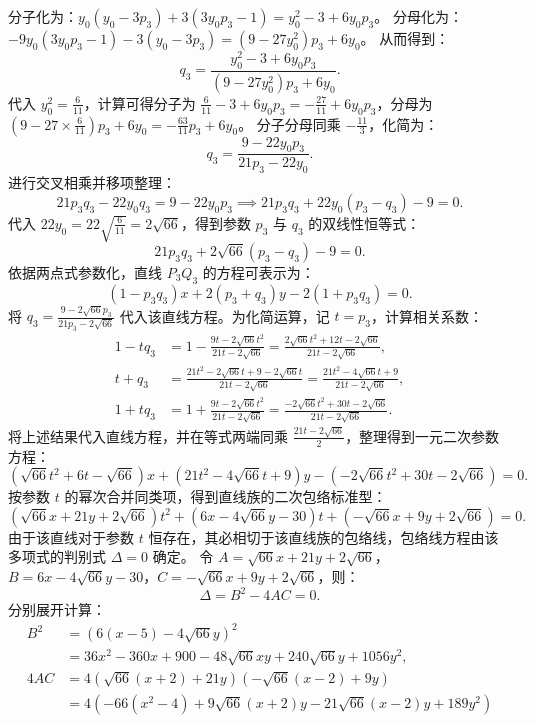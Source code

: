 \begin{solution}
分子化为：$y_0(y_0 - 3p_3) + 3(3y_0 p_3 - 1) = y_0^2 - 3 + 6y_0 p_3$。
分母化为：$-9y_0(3y_0 p_3 - 1) - 3(y_0 - 3p_3) = (9 - 27y_0^2)p_3 + 6y_0$。
从而得到：
\[
q_3 = \frac{y_0^2 - 3 + 6y_0 p_3}{(9 - 27y_0^2)p_3 + 6y_0}.
\]
代入 $y_0^2 = \frac{6}{11}$，计算可得分子为 $\frac{6}{11} - 3 + 6y_0 p_3 = -\frac{27}{11} + 6y_0 p_3$，分母为 $\left(9 - 27 \times \frac{6}{11}\right)p_3 + 6y_0 = -\frac{63}{11} p_3 + 6y_0$。
分子分母同乘 $-\frac{11}{3}$，化简为：
\[
q_3 = \frac{9 - 22y_0 p_3}{21 p_3 - 22y_0}.
\]
进行交叉相乘并移项整理：
\[
21 p_3 q_3 - 22y_0 q_3 = 9 - 22y_0 p_3 \implies 21 p_3 q_3 + 22y_0(p_3 - q_3) - 9 = 0.
\]
代入 $22y_0 = 22\sqrt{\frac{6}{11}} = 2\sqrt{66}$，得到参数 $p_3$ 与 $q_3$ 的双线性恒等式：
\[
21 p_3 q_3 + 2\sqrt{66}(p_3 - q_3) - 9 = 0.
\]
依据两点式参数化，直线 $P_3Q_3$ 的方程可表示为：
\[
(1-p_3 q_3)x + 2(p_3+q_3)y - 2(1+p_3 q_3) = 0.
\]
将 $q_3 = \frac{9 - 2\sqrt{66} p_3}{21 p_3 - 2\sqrt{66}}$ 代入该直线方程。为化简运算，记 $t = p_3$，计算相关系数：
\begin{align*}
1 - t q_3 &= 1 - \frac{9t - 2\sqrt{66} t^2}{21t - 2\sqrt{66}} = \frac{2\sqrt{66} t^2 + 12t - 2\sqrt{66}}{21t - 2\sqrt{66}}, \\
t + q_3 &= \frac{21t^2 - 2\sqrt{66} t + 9 - 2\sqrt{66} t}{21t - 2\sqrt{66}} = \frac{21t^2 - 4\sqrt{66} t + 9}{21t - 2\sqrt{66}}, \\
1 + t q_3 &= 1 + \frac{9t - 2\sqrt{66} t^2}{21t - 2\sqrt{66}} = \frac{-2\sqrt{66} t^2 + 30t - 2\sqrt{66}}{21t - 2\sqrt{66}}.
\end{align*}
将上述结果代入直线方程，并在等式两端同乘 $\frac{21t - 2\sqrt{66}}{2}$，整理得到一元二次参数方程：
\[
(\sqrt{66} t^2 + 6t - \sqrt{66})x + (21t^2 - 4\sqrt{66} t + 9)y - (-2\sqrt{66} t^2 + 30t - 2\sqrt{66}) = 0.
\]
按参数 $t$ 的幂次合并同类项，得到直线族的二次包络标准型：
\[
(\sqrt{66} x + 21 y + 2\sqrt{66}) t^2 + (6x - 4\sqrt{66} y - 30) t + (-\sqrt{66} x + 9 y + 2\sqrt{66}) = 0.
\]
由于该直线对于参数 $t$ 恒存在，其必相切于该直线族的包络线，包络线方程由该多项式的判别式 $\Delta = 0$ 确定。
令 $A = \sqrt{66} x + 21 y + 2\sqrt{66}$，$B = 6x - 4\sqrt{66} y - 30$，$C = -\sqrt{66} x + 9 y + 2\sqrt{66}$，则：
\[
\Delta = B^2 - 4AC = 0.
\]
分别展开计算：
\begin{align*}
B^2 &= (6(x-5) - 4\sqrt{66} y)^2 \\
&= 36x^2 - 360x + 900 - 48\sqrt{66} x y + 240\sqrt{66} y + 1056y^2, \\
4AC &= 4 \left( \sqrt{66}(x+2) + 21y \right) \left( -\sqrt{66}(x-2) + 9y \right) \\
&= 4 \left( -66(x^2 - 4) + 9\sqrt{66}(x+2)y - 21\sqrt{66}(x-2)y + 189y^2 \right) \\

\end{align*}
\end{solution}
